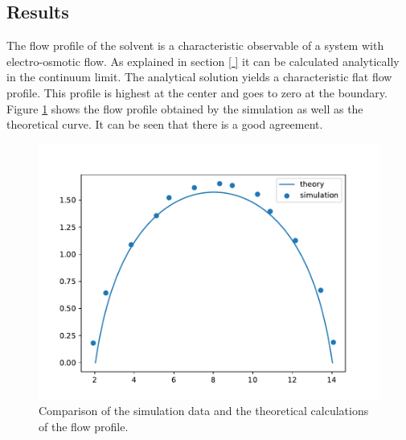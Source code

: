 \subsection{Results}
The flow profile of the solvent is a characteristic observable of a system with electro-osmotic flow. As explained in section \ref{ } it can be calculated analytically in the continuum limit. The analytical solution yields a characteristic flat flow profile. This profile is highest at the center and goes to zero at the boundary. Figure \ref{fig:slit_plot} shows the flow profile obtained by the simulation as well as the theoretical curve. It can be seen that there is a good agreement.

\begin{figure}[H]
	\centering
	\includegraphics[width=\columnwidth]{slit_pore/prodrun_figs/fp}
	\captionsetup{width=\columnwidth}
	\caption{Comparison of the simulation data and the theoretical calculations of the flow profile.}
	\label{fig:slit_plot}
\end{figure}

